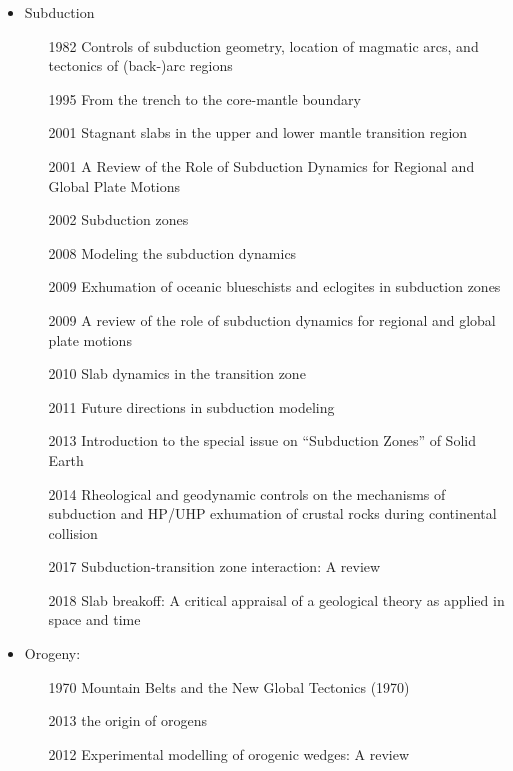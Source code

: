 \begin{itemize}

\item Subduction
   \begin{itemize}
   \item [1982] Controls of subduction geometry, location of magmatic arcs, 
         and tectonics of (back-)arc regions \cite{crpi82}
   \item [1995] From the trench to the core-mantle boundary \cite{kinc95}
   \item [2001] Stagnant slabs in the upper and lower mantle transition region \cite{fuwo01}
   \item [2001] A Review of the Role of Subduction Dynamics for Regional and Global Plate Motions \cite{befa09}
   \item [2002] Subduction zones \cite{ster02}
   \item [2008] Modeling the subduction dynamics \cite{bill08}
   \item [2009] Exhumation of oceanic blueschists and eclogites in subduction zones \cite{agyj09}
   \item [2009] A review of the role of subduction dynamics for regional and global plate motions \cite{befa09}
   \item [2010] Slab dynamics in the transition zone \cite{bill10}
   \item [2011] Future directions in subduction modeling \cite{gery11}
   \item [2013] Introduction to the special issue on “Subduction Zones” of Solid Earth \cite{bufv13}
   \item [2014] Rheological and geodynamic controls on the mechanisms of subduction and HP/UHP exhumation 
                of crustal rocks during continental collision \cite{bufa14,bufy14b}
   \item [2017] Subduction-transition zone interaction: A review \cite{goav17}
   \item [2018] Slab breakoff: A critical appraisal of a geological theory as applied in space and time \cite{garm18}
   \end{itemize}

\item Orogeny:
   \begin{itemize}
   \item [1970] Mountain Belts and the New Global Tectonics (1970) \cite{debi70}
   \item [2013] the origin of orogens \cite{jabe13}
   \item [2012] Experimental modelling of orogenic wedges: A review \cite{grmd12} 
   \end{itemize}


\end{itemize}
